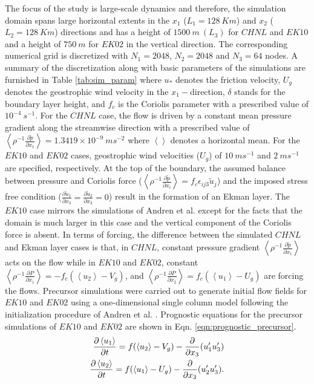 The focus of the study is large-scale dynamics and therefore, the simulation domain spans large horizontal extents in the $x_1$ ($L_{1}=128\ Km$) and $x_2$ ($L_{2}=128\ Km$) directions and has a height of $1500\ m\ (L_3)$ for $CHNL$ and $EK10$ and a height of $750\ m$ for $EK02$ in the vertical direction. The corresponding numerical grid is discretized with $N_{1}= 2048$, $N_{2}=2048$ and $N_{3}=64$ nodes. A summary of the discretization along with basic parameters of the simulations are furnished in Table \ref{tab:sim_param} where  $u_*$ denotes the friction velocity, $U_g$ denotes the geostrophic wind velocity in the $x_1-$direction, $\delta$ stands for the boundary layer height, and $f_c$ is the Coriolis parameter with a prescribed value of $10^{-4}\ s^{-1}$. For the $CHNL$ case, the flow is driven by a constant mean pressure gradient along the streamwise direction with a prescribed value of $\left < \rho^{-1} \frac{\partial \tilde{p}}{\partial x_1} \right > = 1.3419\times 10^{-9}\ ms^{-2}$ where $\left <  \right >$ denotes a horizontal mean. For the $EK10$ and $EK02$ cases, geostrophic wind velocities ($U_{g}$) of $10\ ms^{-1}$ and $2\ ms^{-1}$ are specified, respectively. At the top of the boundary, the assumed balance between pressure and Coriolis force ($\left < \rho^{-1}\frac{\partial \tilde{p} }{\partial x_i} \right > = f_c\epsilon_{ij3}\tilde{u}_j$) and the imposed stress free condition ($\frac{\partial \tilde{u}_1}{\partial x_3}=\frac{\partial \tilde{u}_2}{\partial x_3}=0$) result in the formation of an Ekman layer. The $EK10$ case mirrors the simulations of Andren et al. \cite{andren_brown_qjrm_94} except for the facts that the domain is much larger in this case and the vertical component of the Coriolis force is absent. In terms of forcing, the difference between the simulated $CHNL$ and Ekman layer cases is that, in $CHNL$, constant pressure gradient $\left < \rho^{-1} \frac{\partial \tilde{p}}{\partial x_1} \right >$   acts on the flow while in $EK10$ and $EK02$, constant $\left < \rho^{-1}\frac{\partial P }{\partial x_1} \right >  = -f_c (\left < u_2\right > - V_g)$, and $\left < \rho^{-1}\frac{\partial P }{\partial x_2} \right >  = f_c (\left < u_1\right > - U_g)$ are forcing the flows. Precursor simulations were carried out to generate initial flow fields for $EK10$ and $EK02$ using a one-dimensional single column model following the initialization procedure of Andren et al. \cite{andren_brown_qjrm_94}. Prognostic equations for the precursor simulations of $EK10$ and $EK02$ are shown in Eqn. \ref{eqn:prognostic_precursor}.
\begin{align}
\frac{\partial \left < u_{1} \right >}{\partial t}=f(\left < u_{2} \right > - V_g)-\frac{\partial }{\partial x_3}(u_{1}'u_{3}') \notag \\
\frac{\partial \left < u_{2} \right > }{\partial t}=f(\left < u_{1} \right > - U_g)-\frac{\partial }{\partial x_3}(u_{2}'u_{3}').
\label{eqn:prognostic_precursor}
\end{align} 
